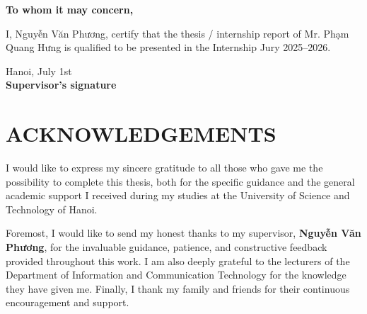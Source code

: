 \documentclass[13pt,a4paper]{extarticle}
\begin{document}

\thispagestyle{fancy}
\vspace*{1cm}
\begin{center}\textbf{To whom it may concern,}\end{center}
\vspace{0.8cm}
\noindent I, Nguyễn Văn Phương, certify that the thesis / internship report of
Mr. Phạm Quang Hưng is qualified to be presented in the Internship Jury
2025--2026.
\vspace{2.0cm}

\begin{flushright}
Hanoi, July 1st\\[4pt]
\textbf{Supervisor's signature}
\end{flushright}
\clearpage

\tableofcontents
\clearpage

\section*{ACKNOWLEDGEMENTS}

I would like to express my sincere gratitude to all those who gave me the possibility to
complete this thesis, both for the specific guidance and the general academic support I received
during my studies at the University of Science and Technology of Hanoi.

Foremost, I would like to send my honest thanks to my supervisor,
\textbf{Nguyễn Văn Phương}, for the invaluable guidance, patience, and constructive feedback
provided throughout this work. I am also deeply grateful to the lecturers of the Department of
Information and Communication Technology for the knowledge they have given me. Finally, I thank my
family and friends for their continuous encouragement and support.
\clearpage

\end{document}
